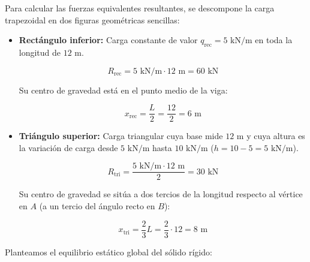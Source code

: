 





Para calcular las fuerzas equivalentes resultantes, se descompone la carga trapezoidal en dos figuras geométricas sencillas:

\begin{itemize}

    \item \textbf{Rectángulo inferior:} Carga constante de valor $q_{\text{rec}} = 5\text{ kN/m}$ en toda la longitud de $12\text{ m}$.

          \[

              R_{\text{rec}} = 5\text{ kN/m} \cdot 12\text{ m} = 60\text{ kN}

          \]

          Su centro de gravedad está en el punto medio de la viga:

          \[

              x_{\text{rec}} = \frac{L}{2} = \frac{12}{2} = 6\text{ m}

          \]

    \item \textbf{Triángulo superior:} Carga triangular cuya base mide $12\text{ m}$ y cuya altura es la variación de carga desde $5\text{ kN/m}$ hasta $10\text{ kN/m}$ ($h = 10 - 5 = 5\text{ kN/m}$).

          \[

              R_{\text{tri}} = \frac{5\text{ kN/m} \cdot 12\text{ m}}{2} = 30\text{ kN}

          \]

          Su centro de gravedad se sitúa a dos tercios de la longitud respecto al vértice en $A$ (a un tercio del ángulo recto en $B$):

          \[

              x_{\text{tri}} = \frac{2}{3}L = \frac{2}{3} \cdot 12 = 8\text{ m}

          \]

\end{itemize}



Planteamos el equilibrio estático global del sólido rígido:

